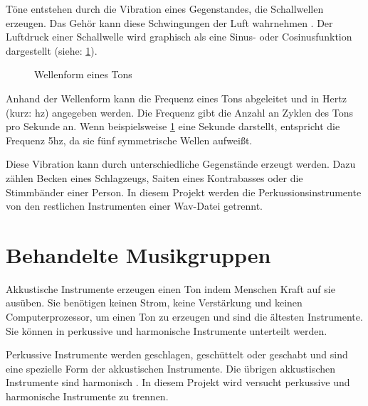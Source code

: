 Töne entstehen durch die Vibration eines Gegenstandes, die Schallwellen erzeugen. Das Gehör kann diese Schwingungen der Luft wahrnehmen \parencite{signaltoene}. Der Luftdruck einer Schallwelle wird graphisch als eine Sinus- oder Cosinusfunktion dargestellt (siehe: \cref{wav_sound}).

\begin{figure}[h]
    \centering
    \caption{Wellenform eines Tons}
    \label{wav_sound}
\end{figure}
\par

Anhand der Wellenform kann die Frequenz eines Tons abgeleitet und in Hertz (kurz: hz) angegeben werden. Die Frequenz gibt die Anzahl an Zyklen des Tons pro Sekunde an. Wenn beispielsweise \cref{wav_sound} eine Sekunde darstellt, entspricht die Frequenz 5hz, da sie fünf symmetrische Wellen aufweißt.

\par

Diese Vibration kann durch unterschiedliche Gegenstände erzeugt werden. Dazu zählen Becken eines Schlagzeugs, Saiten eines Kontrabasses oder die Stimmbänder einer Person. In diesem Projekt werden die Perkussionsinstrumente von den restlichen Instrumenten einer Wav-Datei getrennt.

%
\section{Behandelte Musikgruppen}
%

Akkustische Instrumente erzeugen einen Ton indem Menschen Kraft auf sie ausüben. Sie benötigen keinen Strom, keine Verstärkung und keinen Computerprozessor, um einen Ton zu erzeugen und sind die ältesten Instrumente. Sie können in perkussive und harmonische Instrumente unterteilt werden. 

\par

Perkussive Instrumente werden geschlagen, geschüttelt oder geschabt und sind eine spezielle Form der akkustischen Instrumente. Die übrigen akkustischen Instrumente sind harmonisch \parencite{acoustic_electric_digital_instruments}. In diesem Projekt wird versucht perkussive und harmonische Instrumente zu trennen.

